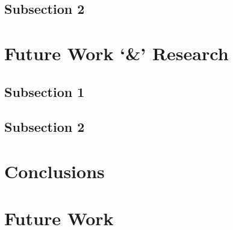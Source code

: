 
\subsection{Subsection 2}




\section{Future Work `\&' Research}


\subsection{Subsection 1}




\subsection{Subsection 2}





\section{Conclusions}

\section{Future Work}

